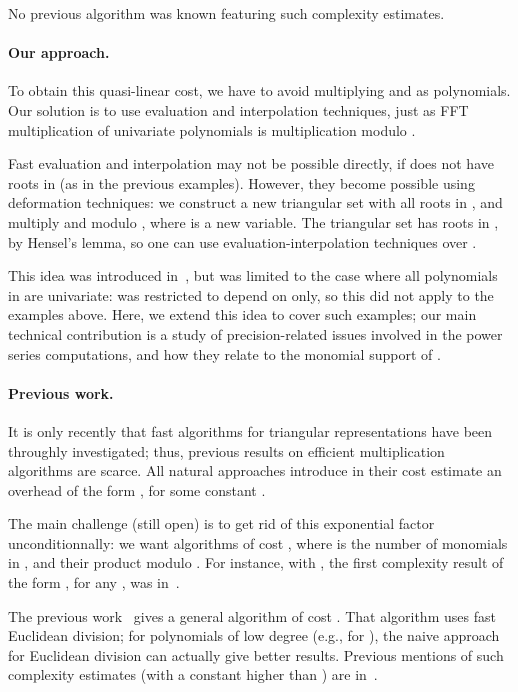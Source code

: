 \documentclass[amsthm]{elsart}
\theoremstyle{plain}
\begin{document}
\smallskip\noindent
No previous algorithm was known featuring such complexity estimates.

\paragraph*{Our approach.}
To obtain this quasi-linear cost, we have to avoid multiplying  and
 as polynomials. Our solution is to use evaluation and
interpolation techniques, just as FFT multiplication of univariate
polynomials is multiplication modulo .

Fast evaluation and interpolation may not be possible directly, if
 does not have roots in  (as in the previous
examples). However, they become possible using deformation techniques:
we construct a new triangular set  with all roots in , and
multiply  and  modulo , where 
is a new variable. The triangular set  has roots in
, by Hensel's lemma, so one can use evaluation-interpolation
techniques over .

This idea was introduced in~\cite{LiMoSc07}, but was limited to the
case where all polynomials in  are univariate:  was
restricted to depend on  only, so this did not apply to the
examples above. Here, we extend this idea to cover such examples; our
main technical contribution is a study of precision-related issues
involved in the power series computations, and how they relate to the
monomial support of .

\paragraph*{Previous work.} It is only recently that fast algorithms
for triangular representations have been throughly investigated; thus,
previous results on efficient multiplication algorithms are scarce.
All natural approaches introduce in their cost estimate an overhead of
the form , for some constant . 

The main challenge (still open) is to get rid of this exponential
factor unconditionnally: we want algorithms of cost
, where  is the number of
monomials in ,  and their product modulo .
For instance, with , the first complexity result of the form
, for any , was in~\cite{Schost05}.

The previous work~\cite{LiMoSc07} gives a general algorithm of cost
. That algorithm uses fast Euclidean division;
for polynomials of low degree (e.g., for ), the naive approach
for Euclidean division can actually give better results.  Previous
mentions of such complexity estimates (with a constant higher than
) are in~\cite{Langemyr91}.
\end{document}
